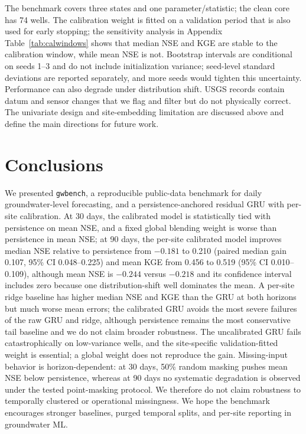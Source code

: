 \documentclass[preprint,12pt]{elsarticle}
\begin{document}
The benchmark covers three states and one parameter/statistic; the clean core
has 74 wells. The calibration weight is fitted on a validation period that is
also used for early stopping; the sensitivity analysis in Appendix Table~\ref{tab:calwindows}
shows that median NSE and KGE are stable to the calibration window, while mean
NSE is not. Bootstrap intervals are conditional on seeds 1--3 and do not
include initialization variance; seed-level standard deviations are reported
separately, and more seeds would tighten this uncertainty. Performance can also
degrade under distribution shift. USGS records contain
datum and sensor changes that we flag and filter but do not physically correct.
The univariate design and site-embedding limitation are discussed above and
define the main directions for future work.

\section{Conclusions}

We presented \texttt{gwbench}, a reproducible public-data benchmark for daily
groundwater-level forecasting, and a persistence-anchored residual GRU with
per-site calibration. At 30 days, the calibrated model is statistically tied
with persistence on mean NSE, and a fixed global blending weight is worse than
persistence in mean NSE; at 90 days, the per-site calibrated model improves
median NSE relative to persistence from $-0.181$ to 0.210 (paired median gain
0.107, 95\% CI 0.048--0.225) and mean KGE from 0.456 to 0.519 (95\% CI
0.010--0.109), although mean NSE is $-0.244$ versus $-0.218$ and its
confidence interval includes zero because one distribution-shift well dominates
the mean. A per-site ridge baseline has higher median NSE and KGE than the GRU
at both horizons but much worse mean errors; the calibrated GRU avoids the most
severe failures of the raw GRU and ridge, although persistence remains the most
conservative tail baseline and we do not claim broader robustness. The
uncalibrated GRU fails
catastrophically on low-variance wells, and the site-specific validation-fitted
weight is essential; a global weight does not reproduce the gain. Missing-input
behavior is horizon-dependent: at 30 days, 50\% random masking pushes mean NSE
below persistence, whereas at 90 days no systematic degradation is observed
under the tested point-masking protocol. We therefore do not claim robustness
to temporally clustered or operational missingness. We hope the benchmark
encourages stronger baselines, purged temporal splits, and per-site reporting
in groundwater ML.
\end{document}
